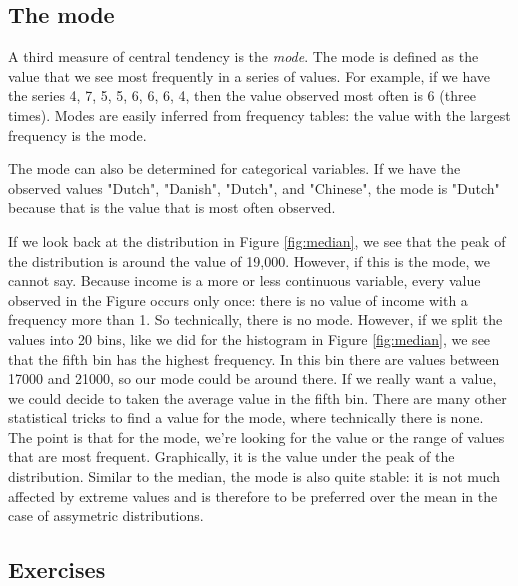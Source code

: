 \documentclass[]{report}\usepackage[]{graphicx}\usepackage[]{color}
\begin{document}
\subsection{The mode}
A third measure of central tendency is the \textit{mode}. The mode is defined as the value that we see most frequently in a series of values. For example, if we have the series 4, 7, 5, 5, 6, 6, 6, 4, then the value observed most often is 6 (three times). Modes are easily inferred from frequency tables: the value with the largest frequency is the mode.

The mode can also be determined for categorical variables. If we have the observed values "Dutch", "Danish", "Dutch", and "Chinese", the mode is "Dutch" because that is the value that is most often observed.

If we look back at the distribution in Figure \ref{fig:median}, we see that the peak of the distribution is around the value of 19,000. However, if this is the mode, we cannot say. Because income is a more or less continuous variable, every value observed in the Figure occurs only once: there is no value of income with a frequency more than 1. So technically, there is no mode. However, if we split the values into 20 bins, like we did for the histogram in Figure \ref{fig:median}, we see that the fifth bin has the highest frequency. In this bin there are values between 17000 and 21000, so our mode could be around there. If we really want a value, we could decide to taken the average value in the fifth bin. There are many other statistical tricks to find a value for the mode, where technically there is none. The point is that for the mode, we're looking for the value or the range of values that are most frequent. Graphically, it is the value under the peak of the distribution. Similar to the median, the mode is also quite stable: it is not much affected by extreme values and is therefore to be preferred over the mean in the case of assymetric distributions.



\subsection{Exercises}
\end{document}
